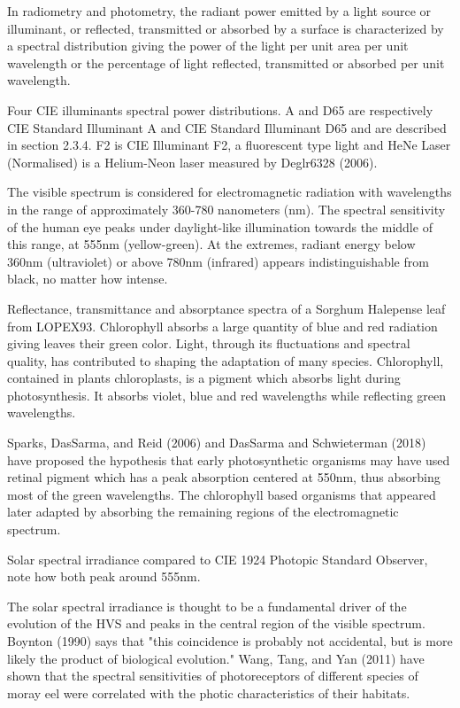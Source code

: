 In radiometry and photometry, the radiant power emitted by a light source or illuminant, or reflected, transmitted or absorbed by a surface is characterized by a spectral distribution giving the power of the light per unit area per unit wavelength or the percentage of light reflected, transmitted or absorbed per unit wavelength.


Four CIE illuminants spectral power distributions. A and D65 are respectively CIE Standard Illuminant A and CIE Standard Illuminant D65 and are described in section 2.3.4. F2 is CIE Illuminant F2, a fluorescent type light and HeNe Laser (Normalised) is a Helium-Neon laser measured by Deglr6328 (2006).

The visible spectrum is considered for electromagnetic radiation with wavelengths in the range of approximately 360-780 nanometers (nm). The spectral sensitivity of the human eye peaks under daylight-like illumination towards the middle of this range, at 555nm (yellow-green). At the extremes, radiant energy below 360nm (ultraviolet)  or above 780nm (infrared) appears indistinguishable from black, no matter how intense.


Reflectance, transmittance and absorptance spectra of a Sorghum Halepense leaf from LOPEX93. Chlorophyll absorbs a large quantity of blue and red radiation giving leaves their green color.
Light, through its fluctuations and spectral quality, has contributed to shaping the adaptation of many species. Chlorophyll, contained in plants chloroplasts, is a pigment which absorbs light during photosynthesis. It absorbs violet, blue and red wavelengths while reflecting green wavelengths.

Sparks, DasSarma, and Reid (2006) and DasSarma and Schwieterman (2018) have proposed the hypothesis that early photosynthetic organisms may have used retinal pigment which has a peak absorption centered at 550nm, thus absorbing most of the green wavelengths. The chlorophyll based organisms that appeared later adapted by absorbing the remaining regions of the electromagnetic spectrum.



Solar spectral irradiance compared to CIE 1924 Photopic Standard Observer, note how both peak around 555nm.

The solar spectral irradiance is thought to be a fundamental driver of the evolution of the HVS and peaks in the central region of the visible spectrum. Boynton (1990) says that "this coincidence is probably not accidental, but is more likely the product of biological evolution." Wang, Tang, and Yan (2011) have shown that the spectral sensitivities of photoreceptors of different species of moray eel were correlated with the photic characteristics of their habitats.


